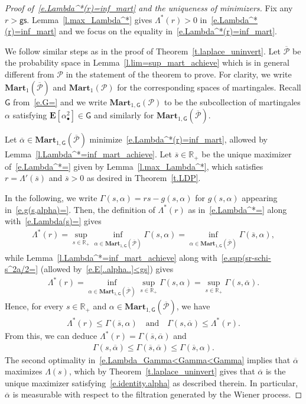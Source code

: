 \documentclass[11pt]{amsart}
\theoremstyle{remark}
\theoremstyle{definition}
\numberwithin{equation}{section}
\numberwithin{proposition}{section}
\numberwithin{figure}{section}
\numberwithin{table}{section}
\newcommand{\R}{\mathbb{R}}
\newcommand{\EE}{\mathbf{E}}
\renewcommand{\leq}{\leqslant}
\renewcommand{\bar}{\overline}
\newcommand{\1}{\mathbf{1}}
\newcommand{\msf}{\mathsf}
\newcommand{\msc}{\mathscr}
\newcommand{\bmart}{\mathbf{Mart}}
\newcommand{\gs}{\msf {gs}}
\begin{document}
\begin{proof}[Proof of~\eqref{e.Lambda^*(r)=inf_mart} and the uniqueness of minimizers]

Fix any $r>\gs$.
Lemma~\ref{l.max_Lambda^*} gives $\Lambda^*(r)>0$ in~\eqref{e.Lambda^*(r)=inf_mart} and we focus on the equality in~\eqref{e.Lambda^*(r)=inf_mart}.

We follow similar steps as in the proof of Theorem~\ref{t.laplace_uninvert}.
Let $\bar{\msc P}$ be the probability space in Lemma~\ref{l.lim=sup_mart_achieve} which is in general different from $\msc P$ in the statement of the theorem to prove. For clarity, we write $\bmart_1(\bar{\msc P})$ and $\bmart_1 (\msc P)$ for the corresponding spaces of martingales. Recall $\msf G$ from~\eqref{e.G=} and we write $\bmart_{1,\msf G}(\msc P)$ to be the subcollection of martingales $\alpha$ satisfying $\EE[\alpha^2_\bullet]\in\msf G$ and similarly for $\bmart_{1,\msf G}(\bar{\msc P})$.

Let $\bar\alpha\in \bmart_{1,\msf G}(\bar{\msc P})$ minimize~\eqref{e.Lambda^*(r)=inf_mart}, allowed by Lemma~\ref{l.Lambda^*=inf_mart_achieve}. Let $\bar s\in\R_+$ be the unique maximizer of~\eqref{e.Lambda^*=} given by Lemma~\ref{l.max_Lambda^*}, which satisfies $r=\Lambda'(\bar s)$ and $\bar s>0$ as desired in Theorem~\ref{t.LDP}.


In the following, we write $\Gamma(s,\alpha) = rs - g(s,\alpha)$ for $g(s,\alpha)$ appearing in~\eqref{e.g(s,alpha)=}.
Then, the definition of $\Lambda^*(r)$ as in~\eqref{e.Lambda^*=} along with~\eqref{e.Lambda(s)=} gives
\begin{align*}
    \Lambda^*(r) = \sup_{s\in\R_+}\inf_{\alpha\in\bmart_{1,\msf G}(\bar{\msc P})}\Gamma(s,\alpha) = \inf_{\alpha\in\bmart_{1,\msf G}(\bar{\msc P})}\Gamma(\bar s,\alpha),
\end{align*}
while Lemma~\ref{l.Lambda^*=inf_mart_achieve} along with~\eqref{e.sup(sr-schi-s^2a/2=} (allowed by~\eqref{e.E[..alpha..]<gs}) gives
\begin{align*}
    \Lambda^*(r)  = \inf_{\alpha\in\bmart_{1,\msf G}(\bar{\msc P})}\sup_{s\in\R_+}\Gamma(s,\alpha) = \sup_{s\in\R_+}\Gamma(s,\bar\alpha).
\end{align*}
Hence, for every $s\in\R_+$ and $\alpha\in\bmart_{1,\msf G}(\bar{\msc P})$, we have
\begin{align*}
    \Lambda^*(r)\leq \Gamma(\bar s,\alpha) \quad \text{and}\quad \Gamma(s,\bar\alpha)\leq \Lambda^*(r).
\end{align*}
From this, we can deduce $\Lambda^*(r)= \Gamma(\bar s,\bar\alpha)$ and
\begin{align}\label{e.Lambda_Gamma<Gamma<Gamma}
    \Gamma(s,\bar\alpha)\leq \Gamma(\bar s,\bar\alpha)\leq \Gamma(\bar s,\alpha).
\end{align}
The second optimality in~\eqref{e.Lambda_Gamma<Gamma<Gamma} implies that $\bar\alpha$ maximizes $\Lambda(s)$, which by Theorem~\ref{t.laplace_uninvert} gives that $\bar\alpha$ is the unique maximizer satisfying~\eqref{e.identity.alpha} as described therein. In particular, $\bar \alpha$ is measurable with respect to the filtration generated by the Wiener process.


\end{proof}
\end{document}
